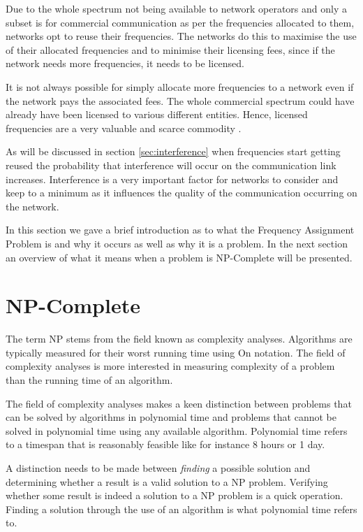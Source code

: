 Due to the whole spectrum not being available to network operators and only a subset is for commercial communication as per the frequencies allocated to them, networks opt to reuse their frequencies\cite{FAPInCell}. The networks do this to maximise the use of their allocated frequencies and to minimise their licensing fees, since if the network needs more frequencies, it needs to be licensed\cite{FAPRAMColouring}.

It is not always possible for simply allocate more frequencies to a network even if the network pays the associated fees. The whole commercial spectrum could have already have been licensed to various different entities. Hence, licensed frequencies are a very valuable and scarce commodity \cite{FAPRAMColouring,FAPInCell,Eisenblatter,Karen2004}.

As will be discussed in section \ref{sec:interference} when frequencies start getting reused the probability that interference will occur on the communication link increases. Interference is a very important factor for networks to consider and keep to a minimum as it influences the quality of the communication occurring on the network.


In this section we gave a brief introduction as to what the Frequency Assignment Problem is and why it occurs as well as why it is a problem. In the next section an overview of what it means when a problem is NP-Complete will be presented.
\section{NP-Complete}
\label{sec:NPComplete}
The term NP stems from the field known as complexity analyses. Algorithms are typically measured for their worst running time using On notation. The field of complexity analyses is more interested in measuring complexity of a problem than the running time of an algorithm\cite{AIModernApproach}.

The field of complexity analyses makes a keen distinction between problems that can be solved by algorithms in polynomial time and problems that cannot be solved in polynomial time using any available algorithm\cite{AIModernApproach}. Polynomial time refers to a timespan that is reasonably feasible like for instance 8 hours or 1 day.

A distinction needs to be made between \emph{finding} a possible solution and determining whether a result is a valid solution to a NP problem. Verifying whether some result is indeed a solution to a NP problem is a quick operation. Finding a solution through the use of an algorithm is what polynomial time refers to.

